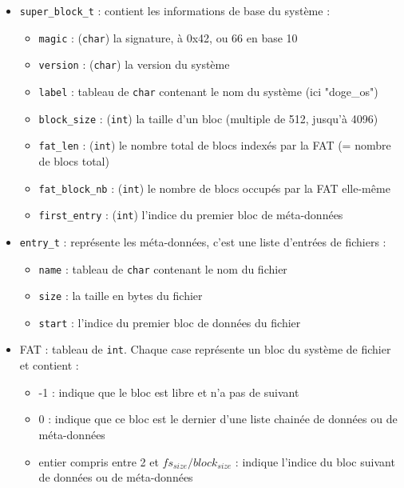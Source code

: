 \documentclass[a4paper, 12pt]{article}
\begin{document}
\begin{itemize}
	\item \texttt{super_block_t} : contient les informations de base du système :
	\begin{itemize}
		\item \texttt{magic} : (\texttt{char}) la signature, à 0x42, ou 66 en base 10
		\item \texttt{version} : (\texttt{char}) la version du système
		\item \texttt{label} : tableau de \texttt{char} contenant le nom du système (ici "doge\_os")
		\item \texttt{block_size} : (\texttt{int}) la taille d'un bloc (multiple de 512, jusqu'à 4096)
		\item \texttt{fat_len} : (\texttt{int}) le nombre total de blocs indexés par la FAT (= nombre de blocs total)
		\item \texttt{fat_block_nb} : (\texttt{int}) le nombre de blocs occupés par la FAT elle-même
		\item \texttt{first_entry} : (\texttt{int}) l'indice du premier bloc de méta-données
	\end{itemize}
	\item \texttt{entry_t} : représente les méta-données, c'est une liste d'entrées de fichiers :
	\begin{itemize}
		\item \texttt{name} : tableau de \texttt{char} contenant le nom du fichier
		\item \texttt{size} : la taille en bytes du fichier
		\item \texttt{start} : l'indice du premier bloc de données du fichier
	\end{itemize}
	\item FAT : tableau de \texttt{int}. Chaque case représente un bloc du système de fichier et contient :
	\begin{itemize}
		\item -1 : indique que le bloc est libre et n'a pas de suivant
		\item 0 : indique que ce bloc est le dernier d'une liste chainée de données ou de méta-données
		\item entier compris entre 2 et $fs_{size} / block_{size}$ : indique l'indice du bloc suivant de données ou de méta-données
	\end{itemize}
\end{itemize}
\end{document}
